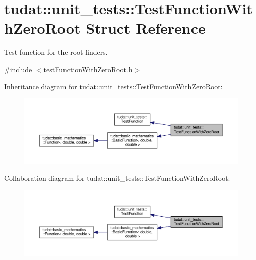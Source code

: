\hypertarget{structtudat_1_1unit__tests_1_1TestFunctionWithZeroRoot}{}\section{tudat\+:\+:unit\+\_\+tests\+:\+:Test\+Function\+With\+Zero\+Root Struct Reference}
\label{structtudat_1_1unit__tests_1_1TestFunctionWithZeroRoot}


Test function for the root-\/finders.  




{\ttfamily \#include $<$test\+Function\+With\+Zero\+Root.\+h$>$}



Inheritance diagram for tudat\+:\+:unit\+\_\+tests\+:\+:Test\+Function\+With\+Zero\+Root\+:
\nopagebreak
\begin{figure}[H]
\begin{center}
\leavevmode
\includegraphics[width=350pt]{structtudat_1_1unit__tests_1_1TestFunctionWithZeroRoot__inherit__graph}
\end{center}
\end{figure}


Collaboration diagram for tudat\+:\+:unit\+\_\+tests\+:\+:Test\+Function\+With\+Zero\+Root\+:
\nopagebreak
\begin{figure}[H]
\begin{center}
\leavevmode
\includegraphics[width=350pt]{structtudat_1_1unit__tests_1_1TestFunctionWithZeroRoot__coll__graph}
\end{center}
\end{figure}
